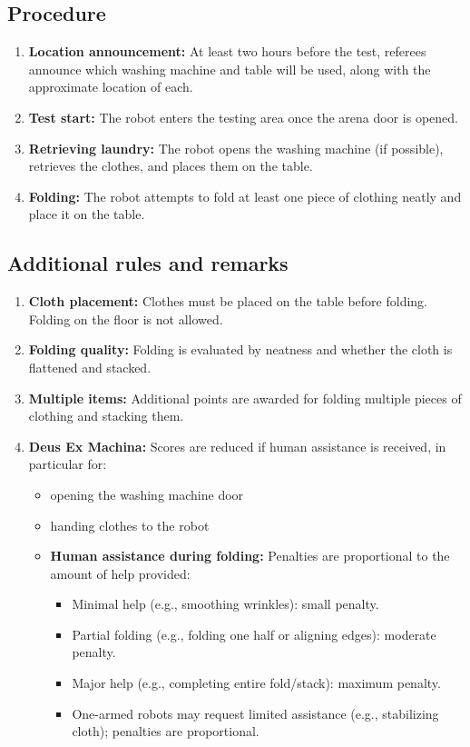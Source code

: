 \subsection*{Procedure}
\begin{enumerate}[nosep]
    \item \textbf{Location announcement:} At least two hours before the test, referees announce which washing machine and table will be used, along with the approximate location of each.
    \item \textbf{Test start:} The robot enters the testing area once the arena door is opened.
    \item \textbf{Retrieving laundry:} The robot opens the washing machine (if possible), retrieves the clothes, and places them on the table.
    \item \textbf{Folding:} The robot attempts to fold at least one piece of clothing neatly and place it on the table.
\end{enumerate}

\subsection*{Additional rules and remarks}
\begin{enumerate}
    \item \textbf{Cloth placement:} Clothes must be placed on the table before folding. Folding on the floor is not allowed.
    \item \textbf{Folding quality:} Folding is evaluated by neatness and whether the cloth is flattened and stacked.
    \item \textbf{Multiple items:} Additional points are awarded for folding multiple pieces of clothing and stacking them.
    \item \textbf{Deus Ex Machina:} Scores are reduced if human assistance is received, in particular for:
    \begin{itemize}
        \item opening the washing machine door
        \item handing clothes to the robot
		\item \textbf{Human assistance during folding:} Penalties are proportional to the amount of help provided:
		\begin{itemize}[nosep]
			\item Minimal help (e.g., smoothing wrinkles): small penalty.
			\item Partial folding (e.g., folding one half or aligning edges): moderate penalty.
			\item Major help (e.g., completing entire fold/stack): maximum penalty.
			\item One-armed robots may request limited assistance (e.g., stabilizing cloth); penalties are proportional.
		\end{itemize}
    \end{itemize}
\end{enumerate}

